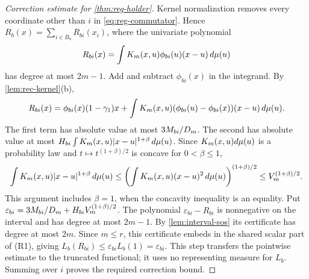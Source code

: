 \begin{proof}[Correction estimate for \cref{thm:reg-holder}]
Kernel normalization removes every coordinate other than $i$ in
\eqref{eq:reg-commutator}. Hence $R_b(x)=\sum_{i\in B_b}R_{bi}(x_i)$,
where the univariate polynomial
\[
 R_{bi}(x)=\int K_m(x,u)\phi_{bi}(u)(x-u)\,d\mu(u)
\]
has degree at most $2m-1$. Add and subtract $\phi_{bi}(x)$ in the
integrand. By \cref{lem:rec-kernel}(b),
\[
 R_{bi}(x)=\phi_{bi}(x)(1-\gamma_1)x
  +\int K_m(x,u)(\phi_{bi}(u)-\phi_{bi}(x))(x-u)\,d\mu(u).
\]
The first term has absolute value at most $3M_{bi}/D_m$. The second
has absolute value at most
$H_{bi}\int K_m(x,u)\lvert x-u\rvert^{1+\beta}\,d\mu(u)$.
Since $K_m(x,u)d\mu(u)$ is a probability law and
$t\mapsto t^{(1+\beta)/2}$ is concave for $0<\beta\le1$,
\[
 \int K_m(x,u)\lvert x-u\rvert^{1+\beta}\,d\mu(u)
 \le\left(\int K_m(x,u)(x-u)^2\,d\mu(u)\right)^{(1+\beta)/2}
 \le V_m^{(1+\beta)/2}.
\]
This argument includes $\beta=1$, when the concavity inequality is an
equality. Put $\varepsilon_{bi}=3M_{bi}/D_m+H_{bi}V_m^{(1+\beta)/2}$.
The polynomial $\varepsilon_{bi}-R_{bi}$ is nonnegative on the interval
and has degree at most $2m-1$. By \cref{lem:interval-sos} its certificate
has degree at most $2m$. Since $m\le r$, this certificate embeds in the
shared scalar part of (R1), giving
$L_b(R_{bi})\le\varepsilon_{bi}L_b(1)=\varepsilon_{bi}$.
This step transfers the pointwise estimate to the truncated functional;
it uses no representing measure for $L_b$. Summing over $i$ proves the
required correction bound.
\end{proof}

